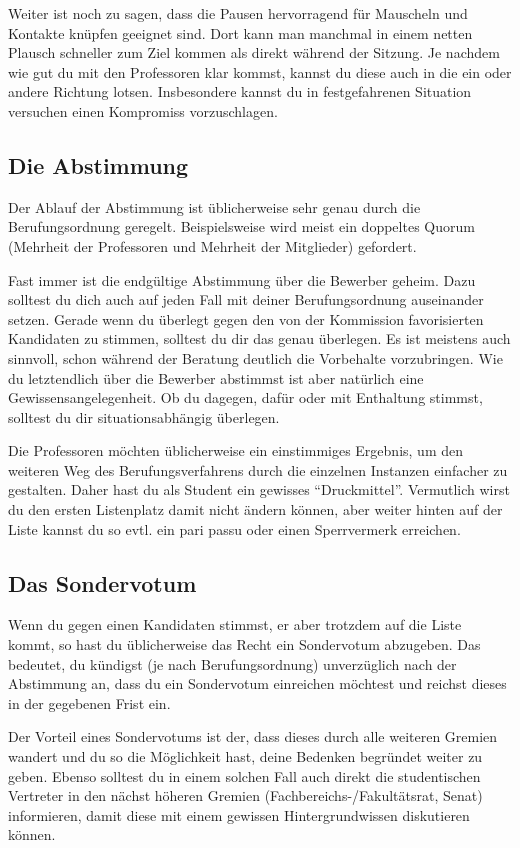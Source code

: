 \documentclass[10pt,twoside,a5paper,openright]{book}
\begin{document}
Weiter ist noch zu sagen, dass die Pausen hervorragend für Mauscheln und Kontakte knüpfen geeignet sind. Dort kann man manchmal in einem netten Plausch schneller zum Ziel kommen als direkt während der Sitzung. Je nachdem wie gut du mit den Professoren klar kommst, kannst du diese auch in die ein oder andere Richtung lotsen. Insbesondere kannst du in festgefahrenen Situation versuchen einen Kompromiss vorzuschlagen. 

\subsection{Die Abstimmung}
Der Ablauf der Abstimmung ist üblicherweise sehr genau durch die Berufungsordnung geregelt. Beispielsweise wird meist ein doppeltes Quorum (Mehrheit der Professoren und Mehrheit der Mitglieder) gefordert. 

Fast immer ist die endgültige Abstimmung über die Bewerber geheim. Dazu solltest du dich auch auf jeden Fall mit deiner Berufungsordnung auseinander setzen. Gerade wenn du überlegt gegen den von der Kommission favorisierten Kandidaten zu stimmen, solltest du dir das genau überlegen. Es ist meistens auch sinnvoll, schon während der Beratung deutlich die Vorbehalte vorzubringen. Wie du letztendlich über die Bewerber abstimmst ist aber natürlich eine Gewissensangelegenheit. Ob du dagegen, dafür oder mit Enthaltung stimmst, solltest du dir situationsabhängig überlegen.

Die Professoren möchten üblicherweise ein einstimmiges Ergebnis, um den weiteren Weg des Berufungsverfahrens durch die einzelnen Instanzen einfacher zu gestalten. Daher hast du als Student ein gewisses "`Druckmittel"'. Vermutlich wirst du den ersten Listenplatz damit nicht ändern können, aber weiter hinten auf der Liste kannst du so evtl. ein pari passu oder einen Sperrvermerk erreichen.


\subsection{Das Sondervotum}
Wenn du gegen einen Kandidaten stimmst, er aber trotzdem auf die Liste kommt, so hast du üblicherweise das Recht ein Sondervotum abzugeben. Das bedeutet, du kündigst (je nach Berufungsordnung) unverzüglich nach der Abstimmung an, dass du ein Sondervotum einreichen möchtest und reichst dieses in der gegebenen Frist ein. 

Der Vorteil eines Sondervotums ist der, dass dieses durch alle weiteren Gremien wandert und du so die Möglichkeit hast, deine Bedenken begründet weiter zu geben. Ebenso solltest du in einem solchen Fall auch direkt die studentischen Vertreter in den nächst höheren Gremien (Fachbereichs-/Fakultätsrat, Senat) informieren, damit diese mit einem gewissen Hintergrundwissen diskutieren können.
\end{document}
